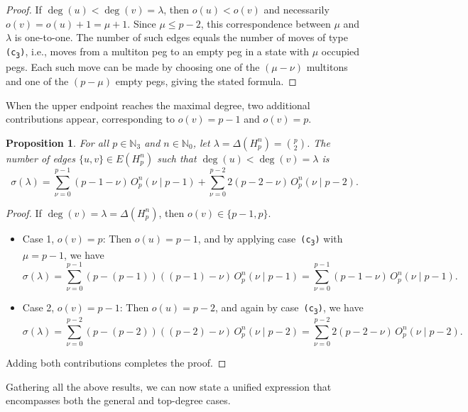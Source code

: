 \documentclass[letterpaper,12pt]{article}
\newtheorem{proposition}{Proposition}
\begin{document}
\begin{proof}
If $\deg(u)<\deg(v)=\lambda$, then $o(u)<o(v)$ and necessarily $o(v)=o(u)+1=\mu+1$.  
Since $\mu\le p-2$, this correspondence between $\mu$ and $\lambda$ is one-to-one.  
The number of such edges equals the number of moves of type \texttt{(c\textsubscript{3})}, i.e., moves from a multiton peg to an empty peg in a state with $\mu$ occupied pegs.  
Each such move can be made by choosing one of the $(\mu-\nu)$ multitons and one of the $(p-\mu)$ empty pegs, giving the stated formula.
\end{proof}


\noindent
When the upper endpoint reaches the maximal degree, two additional contributions appear, corresponding to $o(v)=p-1$ and $o(v)=p$.

\begin{proposition}\label{prop:offdiag-top}
For all $p \in \mathbb{N}_3$ and $n \in \mathbb{N}_0$,  let   $\lambda=\Delta(H_p^n)=\binom{p}{2}$.  
The number of edges $\{u,v\}\in E(H_p^n)$ such that $\deg(u)<\deg(v)=\lambda$ is
\begin{equation}
    \sigma(\lambda)
    = \sum_{\nu = 0}^{p-1} (p-1-\nu)\,O_p^n(\nu \mid p-1)
      + \sum_{\nu = 0}^{p-2} 2(p-2-\nu)\,O_p^n(\nu \mid p-2).
\end{equation}
\end{proposition}

\begin{proof}
If $\deg(v)=\lambda=\Delta(H_p^n)$, then $o(v)\in\{p-1,p\}$.
\begin{itemize}
    \item Case 1, $o(v)=p$:   
Then $o(u)=p-1$, and by applying case~\texttt{(c\textsubscript{3})} with $\mu=p-1$, we have
\[
\sigma(\lambda)
= \sum_{\nu = 0}^{p-1}(p-(p-1))((p-1)-\nu)\,O_p^n(\nu \mid p-1)
= \sum_{\nu = 0}^{p-1}(p-1-\nu)\,O_p^n(\nu \mid p-1).
\]
    \item Case 2, $o(v)=p-1$:  
Then $o(u)=p-2$, and again by case~\texttt{(c\textsubscript{3})}, we have
\[
\sigma(\lambda)
= \sum_{\nu = 0}^{p-2}(p-(p-2))((p-2)-\nu)\,O_p^n(\nu \mid p-2)
= \sum_{\nu = 0}^{p-2}2(p-2-\nu)\,O_p^n(\nu \mid p-2).
\]
\end{itemize}
 

Adding both contributions completes the proof.
\end{proof}


\noindent
Gathering all the above results, we can now state a unified expression that encompasses both the general and top-degree cases.
\end{document}
